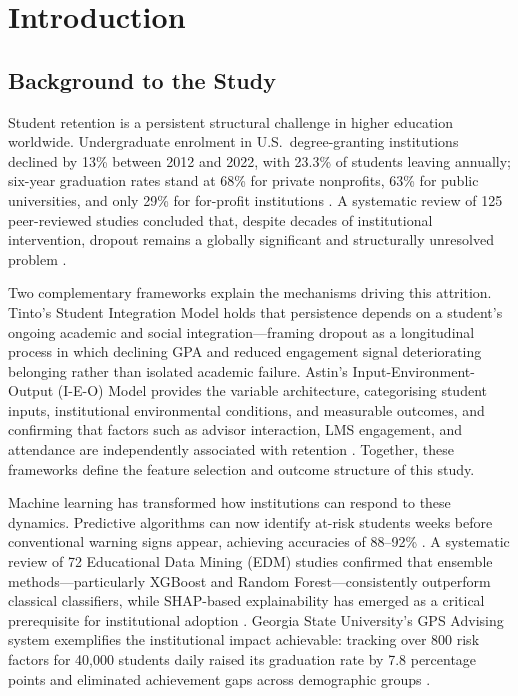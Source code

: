 \documentclass[12pt]{report}
\begin{document}


\chapter{Introduction}

\section{Background to the Study}

Student retention is a persistent structural challenge in higher education
worldwide. Undergraduate enrolment in U.S.\ degree-granting institutions declined
by 13\% between 2012 and 2022, with 23.3\% of students leaving annually;
six-year graduation rates stand at 68\% for private nonprofits, 63\% for public
universities, and only 29\% for for-profit institutions
\parencite{irwin2024}. A systematic review of 125 peer-reviewed studies concluded
that, despite decades of institutional intervention, dropout remains a globally
significant and structurally unresolved problem \parencite{Goncalves2024}.

Two complementary frameworks explain the mechanisms driving this attrition.
Tinto's Student Integration Model \parencite{tinto1975} holds that persistence
depends on a student's ongoing academic and social integration---framing dropout
as a longitudinal process in which declining GPA and reduced engagement signal
deteriorating belonging rather than isolated academic failure. Astin's
Input-Environment-Output (I-E-O) Model \parencite{astin1993} provides the variable
architecture, categorising student inputs, institutional environmental
conditions, and measurable outcomes, and confirming that factors such as advisor
interaction, LMS engagement, and attendance are independently associated with
retention \parencite{Xiao2020}. Together, these frameworks define the feature
selection and outcome structure of this study.

Machine learning has transformed how institutions can respond to these dynamics.
Predictive algorithms can now identify at-risk students weeks before conventional
warning signs appear, achieving accuracies of 88--92\%
\parencite{ahmed2024, gathani2026}. A systematic review of 72 Educational Data
Mining (EDM) studies confirmed that ensemble methods---particularly XGBoost and
Random Forest---consistently outperform classical classifiers, while SHAP-based
explainability has emerged as a critical prerequisite for institutional adoption
\parencite{aldowah2026, kwakye2025}. Georgia State University's GPS Advising system
exemplifies the institutional impact achievable: tracking over 800 risk factors
for 40{,}000 students daily raised its graduation rate by 7.8 percentage points
and eliminated achievement gaps across demographic groups \parencite{gsu2024_}.
\end{document}
